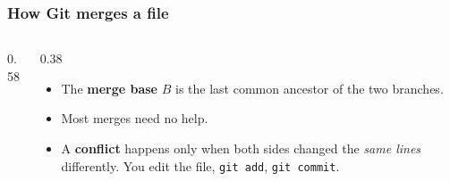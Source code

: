\documentclass[aspectratio=169,10pt,compress]{beamer}
\begin{document}
\begin{frame}[t,fragile] \frametitle{How Git merges a file}
  \begin{columns}[T]
    \begin{column}{0.58\textwidth}
      \SetAlFnt{\small}


\begin{algorithm}[H]
  \caption{Three-way merge of one file}
\end{algorithm}

    \end{column}
    \begin{column}{0.38\textwidth}
      \begin{itemize}\small
        \item The \textbf{merge base} $B$ is the last common ancestor of the two branches.
        \item Most merges need no help.
        \item A \textbf{conflict} happens only when both sides changed the \emph{same lines} differently. You edit the file, \texttt{git add}, \texttt{git commit}.
      \end{itemize}
    \end{column}
  \end{columns}
\end{frame}
\end{document}
